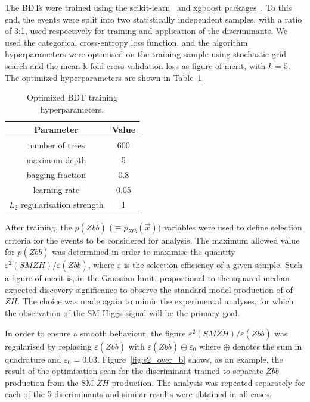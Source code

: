 The BDTs were trained using the scikit-learn~\cite{scikit-learn} and xgboost packages~\cite{xgboost}. To this end, the events were
split into two statistically independent samples, with a ratio of 3:1, used respectively for training and
application of the discriminants. %
We used the categorical cross-entropy loss function, and the algorithm hyperparameters were
optimised on the training sample using stochastic grid search and the mean
k-fold cross-validation loss as figure of merit, with $k = 5$.
The optimized hyperparameters are shown in Table~\ref{tab:bdt_hpars}.

\begin{table}
\centering
\begin{tabular}{|c|c|}
\hline
Parameter & Value \\
\hline
number of trees & 600 \\
maximum depth & 5 \\
bagging fraction & 0.8 \\
learning rate & 0.05 \\
$L_2$ regularisation strength & 1 \\
\hline
\end{tabular}
\caption{
\label{tab:bdt_hpars}
Optimized BDT training hyperparameters.
}
\end{table}

After training, the $p(Z b\bar{b})$ ($\equiv p_{Z b\bar{b}}(\vec x)$) variables were used to define selection criteria
for the events to be considered for analysis. The maximum allowed value for $p(Z b\bar{b})$
was determined in order to maximise the quantity $\varepsilon^2(SM Z H) / \varepsilon(Z
b\bar{b})$, where $\varepsilon$ is the selection efficiency of a given sample. Such a
figure of merit is, in the Gaussian limit, proportional to the squared median expected
discovery significance to observe the standard model production of of $Z H$.
The choice was made again to mimic the experimental analyses, for which the observation of
the SM Higgs signal will be the primary goal.

In order to ensure a smooth behaviour, the figure $\varepsilon^2(SM Z H) /
\varepsilon(Zb\bar{b})$ was regularised by replacing $\varepsilon(Zb\bar{b})$ with
$\varepsilon(Zb\bar{b}) \oplus \varepsilon_0$ where $\oplus$ denotes the sum in quadrature
and $\varepsilon_0 = 0.03$.
Figure~\ref{fig:s2_over_b} shows, as an example, the result of the optimisation scan for
the discriminant trained to separate $Z b\bar{b}$ production from the SM $Z H$
production. The analysis was repeated separately for each of the 5 discriminants and
similar results were obtained in all cases.

